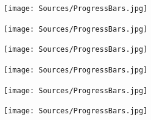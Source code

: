 \begin{figure}[H]
    \begin{subfigure}[l]{23pt}
        \texttt{[image: Sources/ProgressBars.jpg]}
    \end{subfigure}
    \begin{subfigure}[l]{23pt}
        \texttt{[image: Sources/ProgressBars.jpg]}
    \end{subfigure}
    \begin{subfigure}[l]{23pt}
        \texttt{[image: Sources/ProgressBars.jpg]}
    \end{subfigure}
    \begin{subfigure}[l]{23pt}
        \texttt{[image: Sources/ProgressBars.jpg]}
    \end{subfigure}
    \begin{subfigure}[l]{23pt}
        \texttt{[image: Sources/ProgressBars.jpg]}
    \end{subfigure}
    \begin{subfigure}[l]{23pt}
        \texttt{[image: Sources/ProgressBars.jpg]}
    \end{subfigure}
\end{figure}

\vfill

